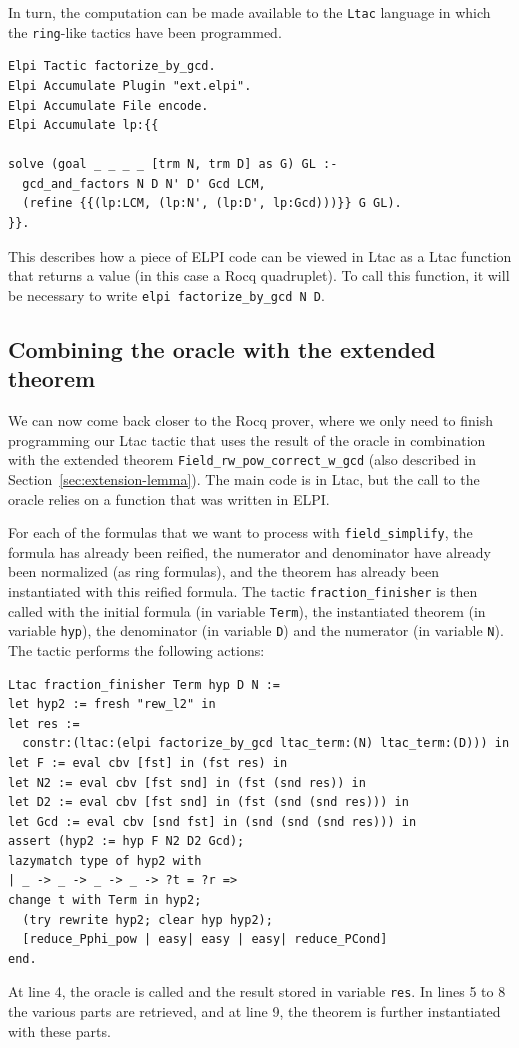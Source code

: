 \documentclass{jflart}
\begin{document}
In turn, the computation can be made available to the \texttt{Ltac}
language in which
the \texttt{ring}-like tactics have been programmed.
\begin{lstlisting}
Elpi Tactic factorize_by_gcd.
Elpi Accumulate Plugin "ext.elpi".
Elpi Accumulate File encode.
Elpi Accumulate lp:{{

solve (goal _ _ _ _ [trm N, trm D] as G) GL :-
  gcd_and_factors N D N' D' Gcd LCM,
  (refine {{(lp:LCM, (lp:N', (lp:D', lp:Gcd)))}} G GL).
}}.
\end{lstlisting}
This describes how a piece of ELPI code can be viewed in Ltac as a Ltac function
that returns a value (in this case a Rocq quadruplet).  To call this function,
it will be necessary to write \texttt{elpi factorize\_by\_gcd N D}.

\subsection{Combining the oracle with the extended theorem}
We can now come back closer to the Rocq prover, where we only need to
finish programming our Ltac tactic that uses the result of the oracle in
combination with the extended theorem \texttt{Field\_rw\_pow\_correct\_w\_gcd}
(also described in Section~\ref{sec:extension-lemma}).
The main code is in Ltac, but the call to the oracle relies on a function
that was written in
ELPI.

For each of the formulas that we want to process with \texttt{field\_simplify},
the formula has already been reified, the numerator and denominator
have already been normalized (as ring formulas), and the theorem has already
been instantiated with this reified formula.  The tactic
\texttt{fraction\_finisher} is then called with the initial formula
(in variable \texttt{Term}), the instantiated theorem (in variable \texttt{hyp}),
the denominator (in variable \texttt{D}) and the numerator (in variable \texttt{N}).
The tactic performs the following actions:
\begin{lstlisting}
Ltac fraction_finisher Term hyp D N :=
let hyp2 := fresh "rew_l2" in
let res :=
  constr:(ltac:(elpi factorize_by_gcd ltac_term:(N) ltac_term:(D))) in
let F := eval cbv [fst] in (fst res) in
let N2 := eval cbv [fst snd] in (fst (snd res)) in
let D2 := eval cbv [fst snd] in (fst (snd (snd res))) in
let Gcd := eval cbv [snd fst] in (snd (snd (snd res))) in
assert (hyp2 := hyp F N2 D2 Gcd);
lazymatch type of hyp2 with
| _ -> _ -> _ -> _ -> ?t = ?r =>
change t with Term in hyp2;
  (try rewrite hyp2; clear hyp hyp2);
  [reduce_Pphi_pow | easy| easy | easy| reduce_PCond]
end.
\end{lstlisting}
At line 4, the oracle is called and the result stored in variable
\texttt{res}.  In lines 5 to 8 the various parts are retrieved, and at
line 9, the theorem is further instantiated with these parts.
\end{document}
